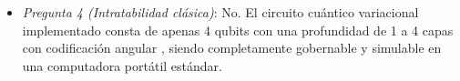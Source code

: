 \begin{itemize}
La configuración del circuito se seleccionó inspeccionando las métricas sobre el conjunto de prueba en el simulador, y el mejor estado resultante se reutilizó posteriormente para ejecutar las pruebas en la máquina cuántica física a lo largo de 20 repeticiones con aumentación de datos \cite{Azevedo2022QuantumTransfer}.
  \item \textit{Pregunta 4 (Intratabilidad clásica)}: No. 
El circuito cuántico variacional implementado consta de apenas 4 qubits con una profundidad de 1 a 4 capas con codificación angular \cite{Azevedo2022QuantumTransfer}, siendo completamente gobernable y simulable en una computadora portátil estándar.
\end{itemize}

